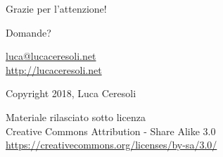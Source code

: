 \documentclass[xetex,table]{beamer}
\begin{document}
\begin{frame}
  \begin{center}
    Grazie per l'attenzione!

    \vspace{0.1\textheight}

    {\Huge Domande?}

    \vspace{0.1\textheight}

    \href{mailto:luca@lucaceresoli.net}{luca@lucaceresoli.net}\\
    \url{http://lucaceresoli.net}

    \textcopyright{} Copyright 2018, Luca Ceresoli\\

    \vspace{0.2\textheight}

    \tiny
    Materiale rilasciato sotto licenza\\
    Creative Commons Attribution - Share Alike 3.0 \\
    \url{https://creativecommons.org/licenses/by-sa/3.0/} \\
\end{center}
\end{frame}
\end{document}
